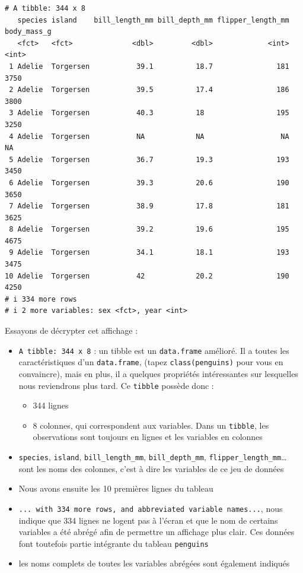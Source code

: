 \documentclass[
  a4paper,
  DIV=11,
  numbers=noendperiod,
  oneside]{scrreprt}
\providecommand{\tightlist}{%
  \setlength{\itemsep}{0pt}\setlength{\parskip}{0pt}}\usepackage{longtable,booktabs,array}
\begin{document}
\begin{verbatim}
# A tibble: 344 x 8
   species island    bill_length_mm bill_depth_mm flipper_length_mm body_mass_g
   <fct>   <fct>              <dbl>         <dbl>             <int>       <int>
 1 Adelie  Torgersen           39.1          18.7               181        3750
 2 Adelie  Torgersen           39.5          17.4               186        3800
 3 Adelie  Torgersen           40.3          18                 195        3250
 4 Adelie  Torgersen           NA            NA                  NA          NA
 5 Adelie  Torgersen           36.7          19.3               193        3450
 6 Adelie  Torgersen           39.3          20.6               190        3650
 7 Adelie  Torgersen           38.9          17.8               181        3625
 8 Adelie  Torgersen           39.2          19.6               195        4675
 9 Adelie  Torgersen           34.1          18.1               193        3475
10 Adelie  Torgersen           42            20.2               190        4250
# i 334 more rows
# i 2 more variables: sex <fct>, year <int>
\end{verbatim}

Essayons de décrypter cet affichage :

\begin{itemize}
\tightlist
\item
  \texttt{A\ tibble:\ 344\ x\ 8} : un tibble est un \texttt{data.frame}
  amélioré. Il a toutes les caractéristiques d'un \texttt{data.frame},
  (tapez \texttt{class(penguins)} pour vous en convaincre), mais en
  plus, il a quelques propriétés intéressantes sur lesquelles nous
  reviendrons plus tard. Ce \texttt{tibble} possède donc :

  \begin{itemize}
  \tightlist
  \item
    344 lignes
  \item
    8 colonnes, qui correspondent aux variables. Dans un
    \texttt{tibble}, les observations sont toujours en lignes et les
    variables en colonnes
  \end{itemize}
\item
  \texttt{species}, \texttt{island}, \texttt{bill\_length\_mm},
  \texttt{bill\_depth\_mm}, \texttt{flipper\_length\_mm}\ldots{} sont
  les noms des colonnes, c'est à dire les variables de ce jeu de données
\item
  Nous avons ensuite les 10 premières lignes du tableau
\item
  \texttt{...\ with\ 334\ more\ rows,\ and\ abbreviated\ variable\ names...},
  nous indique que 334 lignes ne logent pas à l'écran et que le nom de
  certains variables a été abrégé afin de permettre un affichage plus
  clair. Ces données font toutefois partie intégrante du tableau
  \texttt{penguins}
\item
  les noms complets de toutes les variables abrégées sont également
  indiqués
\end{itemize}
\end{document}
